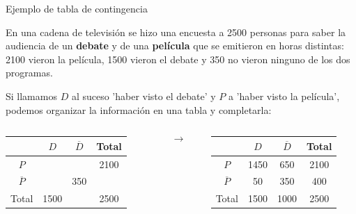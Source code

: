 \documentclass[11pt]{beamer}
\begin{document}
\begin{frame}{Ejemplo de tabla de contingencia}

\begin{block}{}
En una cadena de televisión se hizo una encuesta a 2500 personas para saber la audiencia de un \textbf{debate} y de una \textbf{película} que se emitieron en horas distintas: 2100 vieron la película, 1500 vieron el debate y 350 no
vieron ninguno de los dos programas.
\end{block}

Si llamamos $D$ al suceso 'haber visto el debate'  y $P$ a 'haber visto la película', podemos organizar la información en una tabla y completarla: 
\newline

\pause

\begin{columns}
\begin{column}{0.41\textwidth}  
     \begin{tabular}{|c | c | c | c |} 
     \hline
       &  $D$ & $\overline{D}$ & Total \\ [0.5ex] 
     \hline
     $P$ &  &  & 2100 \\ 
     \hline
     $\overline{P}$ &  & 350 &  \\
     \hline
     Total & 1500 &  &  2500 \\
     \hline
    \end{tabular}
\end{column}
\begin{column}{0.05\textwidth}
  $$\to$$  
\end{column}
\begin{column}{0.41\textwidth}
\pause
     \begin{tabular}{|c | c | c | c |} 
     \hline
      &  $D$ & $\overline{D}$ & Total \\ [0.5ex] 
     \hline
     $P$ & \color{red}1450 & \color{red}650 & 2100 \\ 
     \hline
     $\overline{P}$ & \color{red}50  & 350 & \color{red}400 \\
     \hline
     Total & 1500 & \color{red}1000 &  2500 \\
     \hline
    \end{tabular}
\end{column}
\end{columns}
\end{frame}
\end{document}
